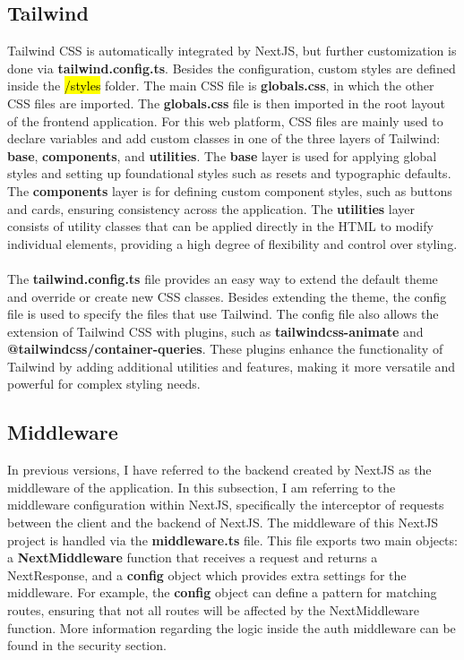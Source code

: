 \subsection{Tailwind}

\noindent Tailwind CSS is automatically integrated by NextJS, but further customization is done via \textbf{tailwind.config.ts}. Besides the configuration, custom styles are defined inside the \hl{/styles} folder. The main CSS file is \textbf{globals.css}, in which the other CSS files are imported. The \textbf{globals.css} file is then imported in the root layout of the frontend application. For this web platform, CSS files are mainly used to declare variables and add custom classes in one of the three layers of Tailwind: \textbf{base}, \textbf{components}, and \textbf{utilities}. The \textbf{base} layer is used for applying global styles and setting up foundational styles such as resets and typographic defaults. The \textbf{components} layer is for defining custom component styles, such as buttons and cards, ensuring consistency across the application. The \textbf{utilities} layer consists of utility classes that can be applied directly in the HTML to modify individual elements, providing a high degree of flexibility and control over styling. 
\\\\
\noindent The \textbf{tailwind.config.ts} file provides an easy way to extend the default theme and override or create new CSS classes. Besides extending the theme, the config file is used to specify the files that use Tailwind. The config file also allows the extension of Tailwind CSS with plugins, such as \textbf{tailwindcss-animate} and \textbf{@tailwindcss/container-queries}. These plugins enhance the functionality of Tailwind by adding additional utilities and features, making it more versatile and powerful for complex styling needs.

\subsection{Middleware}

\noindent In previous versions, I have referred to the backend created by NextJS as the middleware of the application. In this subsection, I am referring to the middleware configuration within NextJS, specifically the interceptor of requests between the client and the backend of NextJS. The middleware of this NextJS project is handled via the \textbf{middleware.ts} file. This file exports two main objects: a \textbf{NextMiddleware} function that receives a request and returns a NextResponse, and a \textbf{config} object which provides extra settings for the middleware. For example, the \textbf{config} object can define a pattern for matching routes, ensuring that not all routes will be affected by the NextMiddleware function. More information regarding the logic inside the auth middleware can be found in the security section.

